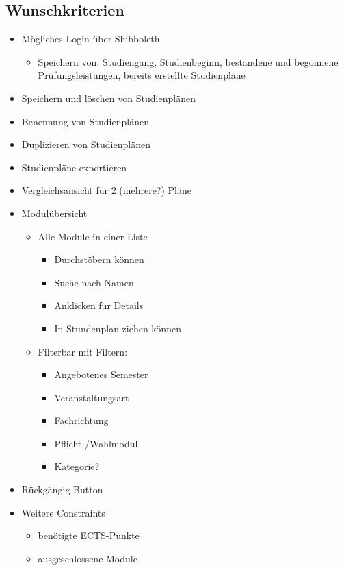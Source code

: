 \documentclass[titlepage=true, parskip=full]{scrartcl}
\begin{document}
\subsection{Wunschkriterien}
\begin{itemize}[nosep]
	\item Mögliches Login über Shibboleth
	\begin{itemize}[nosep]
		\item Speichern von: Studiengang, Studienbeginn, bestandene und begonnene Prüfungsleistungen, bereits erstellte Studienpläne
	\end{itemize}
	\item Speichern und löschen von Studienplänen
	\item Benennung von Studienplänen
	\item Duplizieren von Studienplänen
	\item Studienpläne exportieren
	\item Vergleichsansicht für 2 (mehrere?) Pläne 
	\item Modulübersicht
	\begin{itemize}[nosep]
		\item Alle Module in einer Liste
		\begin{itemize}[nosep]
			\item Durchstöbern können
			\item Suche nach Namen
			\item Anklicken für Details
			\item In Stundenplan ziehen können
		\end{itemize}
		\item Filterbar mit Filtern: 
		\begin{itemize}[nosep]
			\item Angebotenes Semester
			\item Veranstaltungsart
			\item Fachrichtung
			\item Pflicht-/Wahlmodul
			\item Kategorie?
		\end{itemize}
	\end{itemize}
	\item Rückgängig-Button
	\item Weitere Constraints
	\begin{itemize}[nosep]
		\item benötigte ECTS-Punkte
		\item ausgeschlossene Module
	\end{itemize}
\end{itemize}
\end{document}
